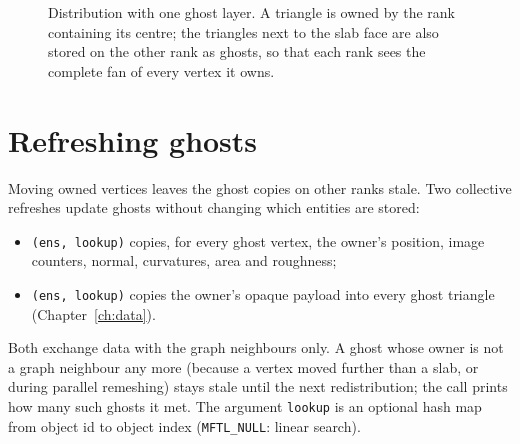 \begin{figure}[ht]
\centering
{}
\caption{Distribution with one ghost layer. A triangle is owned by the rank containing its
centre; the triangles next to the slab face are also stored on the other rank as ghosts, so
that each rank sees the complete fan of every vertex it owns.}
\label{fig:distribution}
\end{figure}

\section{Refreshing ghosts}

Moving owned vertices leaves the ghost copies on other ranks stale. Two collective refreshes
update ghosts without changing which entities are stored:
\begin{itemize}
  \item {}\texttt{(ens, lookup)} copies, for every ghost vertex, the
    owner's position, image counters, normal, curvatures, area and roughness;
  \item {}\texttt{(ens, lookup)} copies the owner's opaque payload into
    every ghost triangle (Chapter~\ref{ch:data}).
\end{itemize}
Both exchange data with the graph neighbours only. A ghost whose owner is not a graph neighbour
any more (because a vertex moved further than a slab, or during parallel remeshing) stays stale
until the next redistribution; the call prints how many such ghosts it met. The argument
\texttt{lookup} is an optional hash map from object id to object index (\texttt{MFTL\_NULL}:
linear search).

